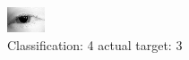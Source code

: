 \begin{figure}[h!]
\begin{center}
\includegraphics[width=0.60\columnwidth]{figures/ID150_class_4_target_3.png}
\end{center}
\caption{ Classification: 4 actual target: 3}
\label{fig:ID150_class_4_target_3}
\end{figure}
